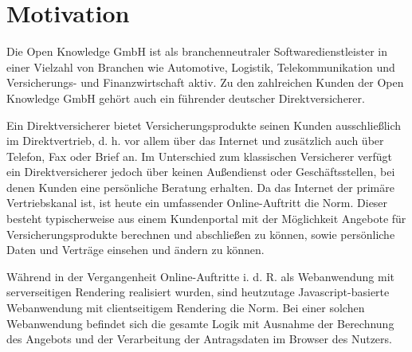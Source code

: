 \vspace{-\baselineskip}

\section{Motivation}

Die Open Knowledge GmbH ist als branchenneutraler Softwaredienstleister in einer Vielzahl von Branchen wie Automotive, Logistik, Telekommunikation und Versicherungs- und Finanzwirtschaft aktiv. Zu den zahlreichen Kunden der Open Knowledge GmbH gehört auch ein führender deutscher Direktversicherer. 

Ein Direktversicherer bietet Versicherungsprodukte seinen Kunden ausschließlich im Direktvertrieb, d. h. vor allem über das Internet und zusätzlich auch über Telefon, Fax oder Brief an. Im Unterschied zum klassischen Versicherer verfügt ein Direktversicherer jedoch über keinen Außendienst oder Geschäftsstellen, bei denen Kunden eine persönliche Beratung erhalten. Da das Internet der primäre Vertriebskanal ist, ist heute ein umfassender Online-Auftritt die Norm. Dieser besteht typischerweise aus einem Kundenportal mit der Möglichkeit Angebote für Versicherungsprodukte berechnen und abschließen zu können, sowie persönliche Daten und Verträge einsehen und ändern zu können.


Während in der Vergangenheit Online-Auftritte i. d. R. als Webanwendung mit serverseitigen Rendering realisiert wurden, sind heutzutage Javascript-basierte Webanwendung mit clientseitigem Rendering die Norm. Bei einer solchen Webanwendung befindet sich die gesamte Logik mit Ausnahme der Berechnung des Angebots und der Verarbeitung der Antragsdaten im Browser des Nutzers.

